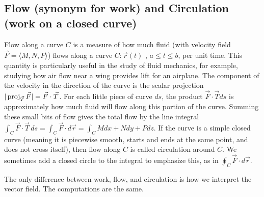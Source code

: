 \subsection{Flow (synonym for work) and Circulation (work on a closed
curve)}
Flow along a curve $C$ is a measure of how much fluid (with velocity
field {$ \vec F = \langle M,N,P\rangle $}) flows along a curve {$C\colon \vec r(t)$ , $a\leq
  t\leq b$,} per unit time. This quantity is particularly useful in the
study of fluid mechanics, for example, studying how air flow near a
wing provides lift for an airplane. The component of the velocity in
the direction of the curve is the scalar projection $|\operatorname{proj}_{\vec
  T}\vec F| = \vec F\cdot \vec T$.  For each little piece of curve $ds$,
the product $\vec F\cdot \vec T ds$ is approximately how much fluid will
flow along this portion of the curve.  Summing these small bits of
flow gives the total flow by the line integral {$\int_C \vec F\cdot \vec T
  \,ds = \int_C \vec F\cdot d\vec r = \int_C Mdx+Ndy+Pdz $}. If the curve is a
simple closed curve (meaning it is piecewise smooth, starts and ends
at the same point, and does not cross itself), then flow along $C$ is
called circulation around $C$.  We sometimes add a closed circle to
the integral to emphasize this, as in {$ \oint_C \vec F \cdot d\vec r $}. 

The only difference between work, flow, and circulation is how we
interpret the vector field.  The computations are the same.





